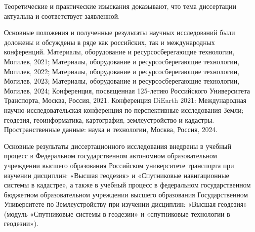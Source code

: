 \begin{center}
	{\reliaprobation}
\end{center}

Теоретические и практические изыскания доказывают, что тема диссертации актуальна и соответствует заявленной.

Основные положения и полученные результаты научных исследований были доложены и обсуждены в ряде как российских, так и международных конференций.  Материалы, оборудование и ресурсосберегающие технологии, Могилев, 2021; Материалы, оборудование и ресурсосберегающие технологии, Могилев, 2022; Материалы, оборудование и ресурсосберегающие технологии, Могилев, 2023; Материалы, оборудование и ресурсосберегающие технологии, Могилев, 2024;  Конференция, посвященная 125-летию Российского Университета Транспорта, Москва, Россия, 2021. Конференция DiEarth 2021: Международная научно-исследовательская конференция по перспективные исследования Земли; геодезия, геоинформатика, картография, землеустройство и кадастры. Пространственные данные: наука и технологии, Москва, Россия, 2024.

Основные результаты диссертационного исследования внедрены в учебный процесс в Федеральном государственном автономном образовательном учреждении высшего образования Российском университете транспорта при изучении дисциплин: «Высшая геодезия» и «Спутниковые навигационные системы в кадастре», а также в учебный процесс в федеральном государственном бюджетном образовательном учреждении высшего образования Государственном Университете по Землеустройству при изучении дисциплин: «Высшая геодезия» (модуль «Спутниковые системы в геодезии» и «спутниковые технологии в геодезии»).

